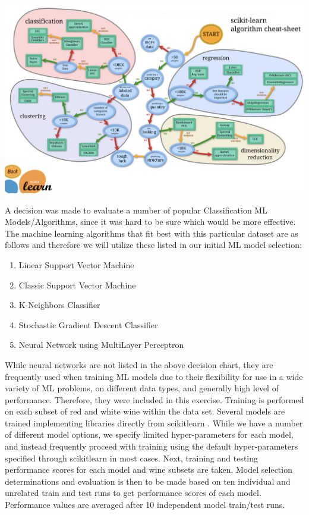 \documentclass[titlepage]{article}
\begin{document}
		\includegraphics[width=.95\textwidth]{img/sklearncheatsheet.png}
		
		A decision was made to evaluate a number of popular Classification ML Models/Algorithms, since it was hard to be sure which would be more effective.  The machine learning algorithms that fit best with this particular dataset are as follows and therefore we will utilize these listed in our initial ML model selection:
	
	\begin{enumerate}
		\item Linear Support Vector Machine
		\item Classic Support Vector Machine
		\item K-Neighbors Classifier
		\item Stochastic Gradient Descent Classifier
		\item Neural Network using MultiLayer Perceptron
	\end{enumerate}
	
		While neural networks are not listed in the above decision chart, they are frequently used when training ML models due to their flexibility for use in a wide variety of ML problems, on different data types, and generally high level of performance. Therefore, they were included in this exercise.  Training is performed on each subset of red and white wine within the data set.  Several models are trained implementing libraries directly from scikitlearn \cite{scikitlearn}.  While we have a number of different model options, we specify limited hyper-parameters for each model, and instead frequently proceed with training using the default hyper-parameters specified through scikitlearn in most cases.  Next, training and testing performance scores for each model and wine subsets are taken.  Model selection determinations and evaluation is then to be made based on ten individual and unrelated train and test runs to get performance scores of each model.  Performance values are averaged after 10 independent model train/test runs.  
	 
\end{document}

